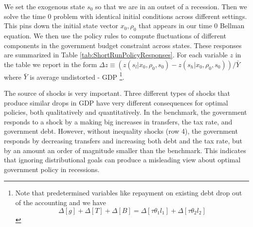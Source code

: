 \documentclass[thmsb,11pt]{article}
\begin{document}
{We set the exogenous state
$s_0$ so  that we are in an outset of a recession.  Then we  solve the time 0 problem with identical initial conditions across
different settings. This pins down the initial state vector  $x_0,\rho_0$  that appears in our time $0$ Bellman equation.
We then use the policy rules to compute fluctuations of
different components in the government budget constraint across states. These responses
are summarized in Table \ref{tab:ShortRunPolicyResponses}. For each variable
$z$ in the table we report in the form $\Delta z\equiv \left( z\left(
s_l|x_0,\rho_0,s_0\right) -z\left( s_h|x_0,\rho_0,s_0\right) \right) /\bar{Y}
$ where $\bar{Y}$ is average undistorted - GDP \footnote{%
Note that predetermined variables like repayment on existing debt drop out
of the accounting and we have
\begin{equation*}
\Delta [g]+\Delta[T]+ \Delta [B]=\Delta[\tau \theta_1 l_1]+ \Delta[\tau
\theta_2 l_2]
\end{equation*}%
}.



The source of shocks is very important. Three different types of shocks
that produce similar drops in GDP  have very different consequences for optimal policies, both qualitatively and
quantitatively. %
In the benchmark, the government responds to a shock by a making big increases in transfers, the  tax rate, and  government debt. However, without inequality shocks (row 4), the government
responds by decreasing transfers and  increasing both debt and
the tax rate, but by an amount an order of magnitude smaller than the benchmark. This  indicates that ignoring distributional goals can produce a misleading view about  optimal government
policy in recessions.



}
\end{document}

